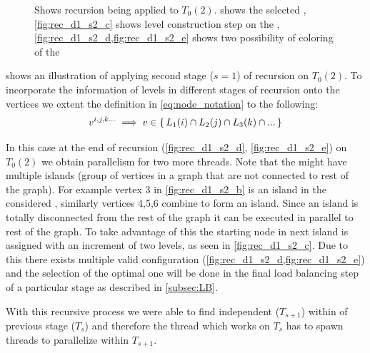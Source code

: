 \begin{figure}[thbp]
     	\caption{Shows recursion being applied to $T_0(2)$.  shows the selected \subgraph, \cref{fig:rec_d1_s2_c} shows level construction step on the \subgraph, \cref{fig:rec_d1_s2_d,fig:rec_d1_s2_e} shows two possibility of \DONE coloring of the \subgraph}
     	
     	\label{fig:rec_d1_s2}
     \end{figure}
     
      shows an illustration of applying second stage ($s=1$) of recursion on $T_0(2)$. To incorporate the information of levels in different stages of recursion onto the vertices we extent the definition in \cref{eq:node_notation} to the following:
	 \begin{equation}
	    v^{i,j,k...} \implies v \in \set{L_1(i) \cap L_2(j) \cap L_3(k) \cap ...} 
	 \end{equation}
	 
     In this case at the end of recursion (\cf \cref{fig:rec_d1_s2_d}, \cref{fig:rec_d1_s2_e}) on $T_0(2)$ we obtain parallelism for two more threads. Note that the \subgraphs might have multiple islands (group of vertices in a graph that are not connected to rest of the graph). For example vertex 3 in \cref{fig:rec_d1_s2_b} is an island in the considered \subgraph, similarly vertices 4,5,6 combine to form an island. Since an island is totally disconnected from the rest of the graph it can be executed in parallel to rest of the graph. To take advantage of this the starting node in next island is assigned with an increment of two levels, as seen in \cref{fig:rec_d1_s2_c}. Due to this there exists multiple valid \DONE configuration (\cf \cref{fig:rec_d1_s2_d,fig:rec_d1_s2_e}) and the selection of the optimal one will be done in the final load balancing step of a particular stage as described in \cref{subsec:LB}.    
     
     With this recursive process we were able to find independent \levelGroups ($T_{s+1}$) within \levelGroup of previous stage ($T_s$) and therefore the thread which works on $T_s$ has to spawn threads to parallelize within $T_{s+1}$.
     
